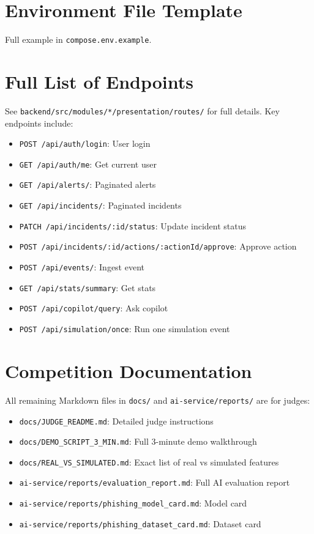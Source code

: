 \documentclass[12pt,a4paper,twoside]{report}
\begin{document}
\chapter{Environment File Template}
\label{app:env}
Full example in \texttt{compose.env.example}.

\chapter{Full List of Endpoints}
\label{app:api}
See \texttt{backend/src/modules/*/presentation/routes/} for full details. Key endpoints include:
\begin{itemize}[noitemsep]
    \item \texttt{POST /api/auth/login}: User login
    \item \texttt{GET /api/auth/me}: Get current user
    \item \texttt{GET /api/alerts/}: Paginated alerts
    \item \texttt{GET /api/incidents/}: Paginated incidents
    \item \texttt{PATCH /api/incidents/:id/status}: Update incident status
    \item \texttt{POST /api/incidents/:id/actions/:actionId/approve}: Approve action
    \item \texttt{POST /api/events/}: Ingest event
    \item \texttt{GET /api/stats/summary}: Get stats
    \item \texttt{POST /api/copilot/query}: Ask copilot
    \item \texttt{POST /api/simulation/once}: Run one simulation event
\end{itemize}

\chapter{Competition Documentation}
\label{app:docs}
All remaining Markdown files in \texttt{docs/} and \texttt{ai-service/reports/} are for judges:
\begin{itemize}[noitemsep]
    \item \texttt{docs/JUDGE\_README.md}: Detailed judge instructions
    \item \texttt{docs/DEMO\_SCRIPT\_3\_MIN.md}: Full 3-minute demo walkthrough
    \item \texttt{docs/REAL\_VS\_SIMULATED.md}: Exact list of real vs simulated features
    \item \texttt{ai-service/reports/evaluation\_report.md}: Full AI evaluation report
    \item \texttt{ai-service/reports/phishing\_model\_card.md}: Model card
    \item \texttt{ai-service/reports/phishing\_dataset\_card.md}: Dataset card
\end{itemize}

\clearpage

{} %
%
%
\end{document}
